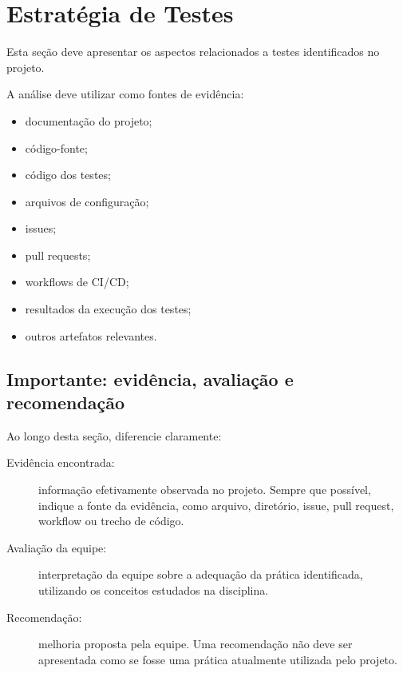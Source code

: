 \section{Estratégia de Testes}

Esta seção deve apresentar os aspectos relacionados a testes
identificados no projeto.

A análise deve utilizar como fontes de evidência:

\begin{itemize}
    \item documentação do projeto;
    \item código-fonte;
    \item código dos testes;
    \item arquivos de configuração;
    \item issues;
    \item pull requests;
    \item workflows de CI/CD;
    \item resultados da execução dos testes;
    \item outros artefatos relevantes.
\end{itemize}

\subsection*{Importante: evidência, avaliação e recomendação}

Ao longo desta seção, diferencie claramente:

\begin{description}

\item[Evidência encontrada:]
informação efetivamente observada no projeto. Sempre que possível,
indique a fonte da evidência, como arquivo, diretório, issue,
pull request, workflow ou trecho de código.

\item[Avaliação da equipe:]
interpretação da equipe sobre a adequação da prática identificada,
utilizando os conceitos estudados na disciplina.

\item[Recomendação:]
melhoria proposta pela equipe. Uma recomendação não deve ser
apresentada como se fosse uma prática atualmente utilizada
pelo projeto.

\end{description}




